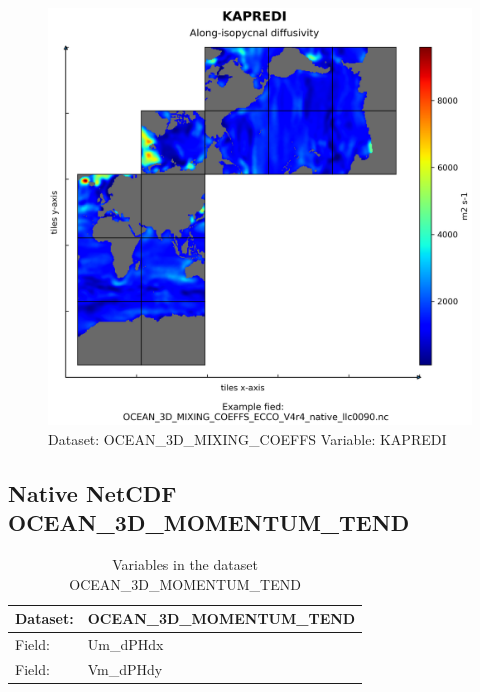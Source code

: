 \begin{figure}[H]
\centering
\includegraphics[scale=0.55]{../images/plots/native_plots/Ocean_3D_Gent-Mcwilliams_Redi_and_Background_Vertical_Diffusivity_Coefficients_for_the_Lat-Lon-Cap_90_(llc90)_Native_Model_Grid_(Version_4_Release_4)/KAPREDI.png}
\caption{Dataset: OCEAN\_3D\_MIXING\_COEFFS Variable: KAPREDI}
\label{tab:table-OCEAN_3D_MIXING_COEFFS_KAPREDI-Plot}
\end{figure}
\pagebreak
\subsection{Native NetCDF OCEAN\_3D\_MOMENTUM\_TEND}
\newp
\begin{longtable}{|p{}|p{}|}
\caption{Variables in the dataset OCEAN\_3D\_MOMENTUM\_TEND}
\label{tab:table-OCEAN_3D_MOMENTUM_TEND-fields} \\ 
\hline \endhead \hline \endfoot
\rowcolor{lightgray} \textbf{Dataset:} & \textbf{OCEAN\_3D\_MOMENTUM\_TEND} \\ \hline
Field: &Um\_dPHdx \\ \hline
Field: &Vm\_dPHdy \\ \hline
\end{longtable}

\pagebreak
